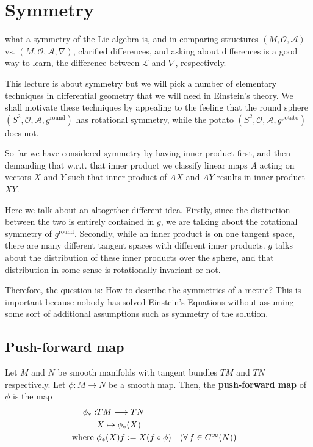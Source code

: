 \section{Symmetry}
\begin{framed}
what a symmetry of the Lie algebra is, and in comparing structures $(M,\mathcal{O}, \mathcal{A})$ vs. $(M,\mathcal{O}, \mathcal{A}, \nabla)$, clarified differences, and asking about differences is a good way to learn, the difference between $\mathcal{L}$ and $\nabla$, respectively.  

This lecture is about symmetry but we will pick a number of elementary techniques in differential geometry that we will need in Einstein's theory. We shall motivate these techniques by appealing to the feeling that the round sphere $(S^2, \mathcal{O}, \mathcal{A},g^{\text{round}})$ has rotational symmetry, while the potato $(S^2, \mathcal{O},\mathcal{A}, g^{\text{potato}})$ does not.

So far we have considered symmetry by having inner product first, and then demanding that w.r.t. that inner product we classify linear maps $A$ acting on vectors $X$ and $Y$ such that inner product of $AX$ and $AY$ results in inner product $XY$.

Here we talk about an altogether different idea. Firstly, since the distinction between the two is entirely contained in $g$, we are talking about the rotational symmetry of $g^{\text{round}}$. Secondly, while an inner product is on one tangent space, there are many different tangent spaces with different inner products. $g$ talks about the distribution of these inner products over the sphere, and that distribution in some sense is rotationally invariant or not.

Therefore, the question is: How to describe the symmetries of a metric? This is important because nobody has solved Einstein's Equations without assuming some sort of additional assumptions such as symmetry of the solution.
\end{framed}

\subsection{Push-forward map}
\begin{definition}
Let $M$ and $N$ be smooth manifolds with tangent bundles $TM$ and $TN$ respectively. Let $\phi : M \to N$ be a smooth map. Then, the \textbf{push-forward map} of $\phi$ is the map
\begin{align}
\phi_{\ast} : & TM \longrightarrow TN \nonumber \\
& X \mapsto \phi_\ast(X) \nonumber \\
\label{eq_defPushForwardMap}\text{where } & \phi_\ast(X) f := X (f \circ \phi) && (\forall \, f \in C^\infty(N))
\end{align}
\end{definition}

